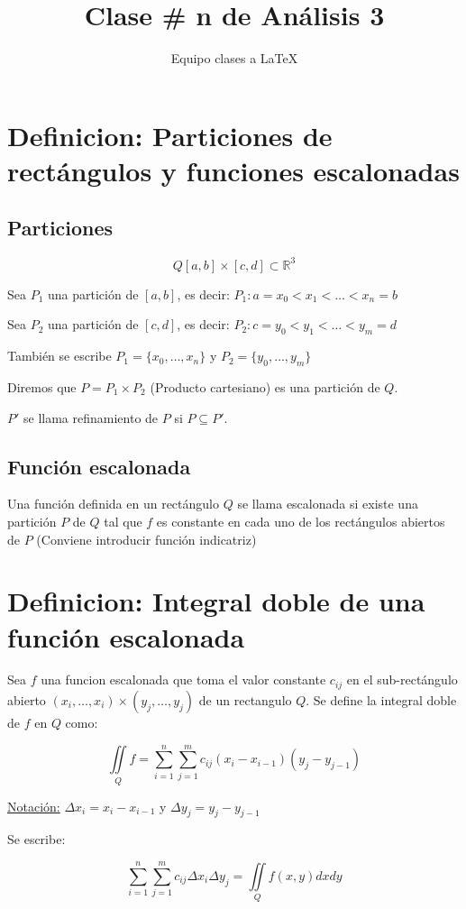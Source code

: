 \documentclass[12pt]{article}
\title{Clase \# n de Análisis 3}
\author{Equipo clases a \LaTeX}
\newcommand{\definicion}[1]{\section{Definicion: #1}}
\newcommand{\R}[1]{\mathbb{R}^{#1}}
\begin{document}
	
	\maketitle
	\tableofcontents
	
	\definicion{Particiones de rectángulos y funciones escalonadas} 
	
	\subsection{Particiones}
	
	$$ Q [a,b]\times[c,d] \subset \R{3} $$
	
	Sea $P_1$ una partición de $[a,b]$, es decir: $P_1 : a=x_0<x_1<\dots<x_n=b$
	
	Sea $P_2$ una partición de $[c,d]$, es decir: $P_2 : c=y_0<y_1<\dots<y_m=d$
	
	También se escribe $P_1 = \{x_0,\dots,x_n\}$ y $P_2=\{ y_0,\dots,y_m \}$
	
	Diremos que $P = P_1\times P_2$ (Producto cartesiano) es una partición de $Q$.
	
	$P'$ se llama refinamiento de $P$ si $P\subseteq P'$.
	
	\subsection{Función escalonada}
	
	Una función definida en un rectángulo $Q$ se llama escalonada si existe una partición $P$ de $Q$ tal que $f$ es constante en cada uno de los rectángulos abiertos de $P$ (Conviene introducir función indicatriz)
	
	\definicion{Integral doble de una función escalonada}
	
	Sea $f$ una funcion escalonada que toma el valor constante $c_{ij}$ en el sub-rectángulo abierto $(x_i,\dots,x_i)\times(y_j,\dots,y_j)$ de un rectangulo $Q$. Se define la integral doble de $f$ en $Q$ como:
	
	\begin{equation}
		\iint\limits_Q f = \sum_{i=1}^{n} \sum_{j=1}^{m} c_{ij}(x_i-x_{i-1})(y_j-y_{j-1})
	\end{equation} 
	 
	\underline{Notación:} $\Delta x_i = x_i - x_{i-1}$ y  $\Delta y_j = y_j - y_{j-1}$
	
	Se escribe:
	
	\begin{equation}
		\sum_{i=1}^{n} \sum_{j=1}^{m} c_{ij}\Delta x_i \Delta y_j = \iint\limits_Q f(x,y)dxdy
	\end{equation}
	
\end{document}
